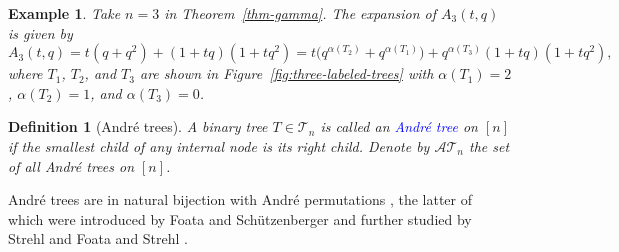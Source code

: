 \documentclass[12pt]{article}
\def\blue{\textcolor{blue}}
\def\blue{\textcolor{blue}}
\numberwithin{equation}{section}
\def\blue{\textcolor{blue}}
\def\blue{\textcolor{blue}}
\theoremstyle{plain}
\newtheorem{definition}[theorem]{Definition}
\newtheorem{example}[theorem]{Example}
\def\B{\mathcal{T}}
\def\AT{\mathcal{AT}}
\begin{document}
	 	 \begin{example}
	 		Take $n=3$ in Theorem~\ref{thm-gamma}. The expansion of $A_3(t,q)$ is given by
	 		\[
	 		A_3(t,q)=t(q+q^2)+(1+tq)(1+tq^2)=t\big(q^{\alpha(T_2)}+q^{\alpha(T_1)}\big)+ q^{\alpha(T_3)}(1+tq)(1+tq^2),
	 		\]
	 		where $T_1$, $T_2$, and $T_3$ are shown in Figure~\ref{fig:three-labeled-trees} with $\alpha(T_1)=2$, $\alpha(T_2)=1$, and $\alpha(T_3)=0$.
	 	\end{example}
	 		\begin{definition}[Andr\'e  trees]
	 		A binary tree $T\in\B_n$ is called an \blue{ Andr\'e  tree} on $[n]$ if the smallest
	 		child of any internal node is its right child. 
	 		Denote by $\AT_n$ the set of all   Andr\'e   trees on $[n]$. 
	 	\end{definition} 		
	 	Andr\'e trees are in natural bijection with Andr\'e permutations \cite{Lin-Wen-Yan}, the latter of which were introduced by Foata and Sch\"utzenberger \cite{FS70} and further studied by Strehl \cite{Str74} and Foata and Strehl \cite{FS74,FS76}.
	 	
\end{document}
